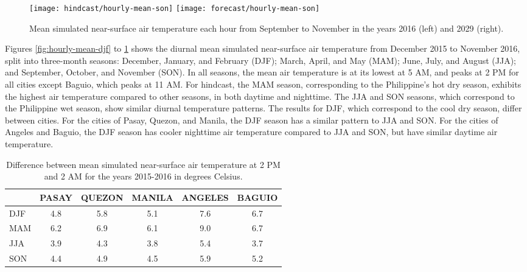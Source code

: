 	\begin{figure}	
		\centering
		\texttt{[image: hindcast/hourly-mean-son]}		
		\texttt{[image: forecast/hourly-mean-son]}		
		\caption{
			Mean simulated near-surface air temperature each hour from September to November in the years 2016 (left) and 2029 (right).
		}
		\label{fig:hourly-mean-son}
	\end{figure}

	Figures \ref{fig:hourly-mean-djf} to \ref{fig:hourly-mean-son} shows the diurnal mean simulated near-surface air temperature from December 2015 to November 2016, split into three-month seasons:
		December, January, and February (DJF);
		March, April, and May (MAM);
		June, July, and August (JJA);
		and
		September, October, and November (SON).
	In all seasons, the mean air temperature is at its lowest at 5 AM, and peaks at 2 PM for all cities except Baguio, which peaks at 11 AM.
	For hindcast, the MAM season, corresponding to the Philippine's hot dry season, exhibits the highest air temperature compared to other seasons, in both daytime and nighttime.
	The JJA and SON seasons, which correspond to the Philippine wet season, show similar diurnal temperature patterns.
	The results for DJF, which correspond to the cool dry season, differ between cities.
	For the cities of Pasay, Quezon, and Manila, the DJF season has a similar pattern to JJA and SON.
	For the cities of Angeles and Baguio, the DJF season has cooler nighttime air temperature compared to JJA and SON, but have similar daytime air temperature.
	
	\begin{table}[]
		\caption{
			Difference between mean simulated near-surface air temperature at 2 PM and 2 AM for the years 2015-2016 in degrees Celsius.
		}
		\label{tab:hindcast-difference-day-night}
		\centering
		\begin{tabular}{lSSSSS}
			\hline \hline
			& {PASAY} & {QUEZON} & {MANILA} & {ANGELES} & {BAGUIO} \\
			\hline
			DJF & 4.8   & 5.8    & 5.1    & 7.6     & 6.7    \\
			MAM & 6.2   & 6.9    & 6.1    & 9.0     & 6.7    \\
			JJA & 3.9   & 4.3    & 3.8    & 5.4     & 3.7    \\
			SON & 4.4   & 4.9    & 4.5    & 5.9     & 5.2    \\
			\hline
		\end{tabular}
	\end{table}

